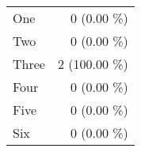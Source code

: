 \begin{tabular}{ l  r }
One & 0 (0.00 \%)\\
Two & 0 (0.00 \%)\\
Three & 2 (100.00 \%)\\
Four & 0 (0.00 \%)\\
Five & 0 (0.00 \%)\\
Six & 0 (0.00 \%)\\
\end{tabular}